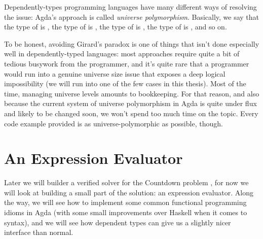 Dependently-types programming languages have many different ways of resolving
the issue: Agda's approach is called \emph{universe polymorphism}.
Basically, we say that the type of  is
, the type of  is
, the type of 
is , the type of 
is , and so on.

To be honest, avoiding Girard's paradox is one of things that isn't done
especially well in dependently-typed languages: most approaches require quite a
bit of tedious busywork from the programmer, and it's quite rare that a
programmer would run into a genuine universe size issue that exposes a deep
logical impossibility (we will run into one of the few cases in this thesis).
Most of the time, managing universe levels amounts to bookkeeping.
For that reason, and also because the current system of universe polymorphism in
Agda is quite under flux and likely to be changed soon, we won't spend too much
time on the topic.
Every code example provided is as universe-polymorphic as possible, though.

\section{An Expression Evaluator}
\begin{agdalisting}
\end{agdalisting}
Later we will builder a verified solver for the Countdown problem
\cite{huttonCountdownProblem2002} , for
now we will look at building a small part of the solution: an expression
evaluator.
Along the way, we will see how to implement some common functional programming
idioms in Agda (with some small improvements over Haskell when it comes to
syntax), and we will see how dependent types can give us a slightly nicer
interface than normal.

